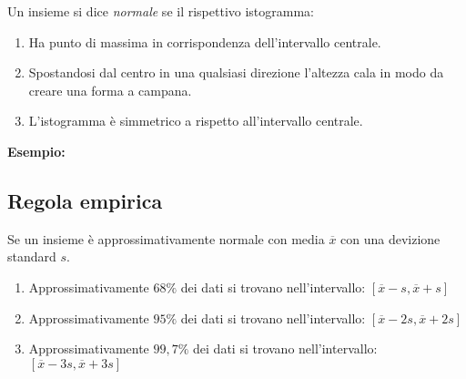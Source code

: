\documentclass{article}
\begin{document}
\begin{tcolorbox}
Un insieme si dice \textit{normale} se il rispettivo istogramma:
\begin{enumerate}
  \item Ha punto di massima in corrispondenza dell'intervallo centrale.
  \item Spostandosi dal centro in una qualsiasi direzione l'altezza cala in modo da creare una forma a campana.
  \item L'istogramma è simmetrico a rispetto all'intervallo centrale.
\end{enumerate}
 
  \textbf{Esempio:} 


\end{tcolorbox}

\subsection*{Regola empirica}

Se un insieme è approssimativamente normale con media $\overline{x}$ con una devizione standard $s$.

\begin{enumerate}
  \item Approssimativamente $68\%$ dei dati si trovano nell'intervallo: $[\overline{x}-s,\overline{x}+s]$
  \item Approssimativamente $95\%$ dei dati si trovano nell'intervallo: $[\overline{x}-2s,\overline{x}+2s]$
  \item Approssimativamente $99,7\%$ dei dati si trovano nell'intervallo: $[\overline{x}-3s,\overline{x}+3s]$

\end{enumerate}

\hfill
\end{document}
